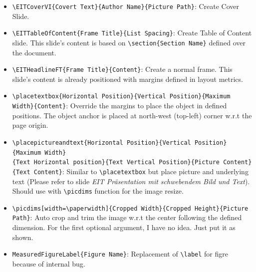 \documentclass[10pt,landscape]{article}
\makeatletter
\renewcommand{\section}{\@startsection{section}{1}{0mm}%
                                {-1ex plus -.5ex minus -.2ex}%
                                {0.5ex plus .2ex}%
                                {\normalfont\large\bfseries}}
\makeatother
\begin{document}
\begin{multicols}{2}
\begin{itemize}
  \item \verb!\EITCoverVI{Covert Text}{Author Name}{Picture Path}!: Create Cover Slide.
  \item \verb!\EITTableOfContent{Frame Title}{List Spacing}!: Create Table of Content slide. This slide's content is based on \verb!\section{Section Name}! defined over the document.
  \item \verb!\EITHeadlineFT{Frame Title}{Content}!: Create a normal frame. This slide's content is already positioned with margins defined in layout metrics.
  \item \verb!\placetextbox{Horizontal Position}{Vertical Position}{Maximum Width}{Content}!: Override the margins to place the object in defined positions. The object anchor is placed at north-west (top-left) corner w.r.t the page origin.
  \item \verb!\placepictureandtext{Horizontal Position}{Vertical Position}{Maximum Width}!\\\verb!{Text Horizontal position}{Text Vertical Position}{Picture Content}{Text Content}!: Similar to \verb!\placetextbox! but 
  place picture and underlying text (Please refer to slide \emph{EIT Präsentation mit schwebendem Bild und Text}). Should use with \verb!\picdims! function for the image resize.
  \item \verb!\picdims[width=\paperwidth]{Cropped Width}{Cropped Height}{Picture Path}!: Auto crop and trim the image w.r.t the center following the defined dimension. For the first optional argument, I have no idea. Just put it as shown.
  \item \verb!MeasuredFigureLabel{Figure Name}!: Replacement of \verb!\label! for figre because of internal bug.
\end{itemize}


\end{multicols}
\end{document}
